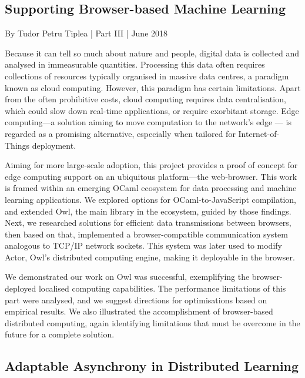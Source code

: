 \hypertarget{Supporting Browser-based Machine Learning}{%
\subsection{Supporting Browser-based Machine Learning}\label{theses-webml}}

By Tudor Petru Tiplea | Part III | June 2018

Because it can tell so much about nature and people, digital data is collected and analysed in immeasurable quantities. Processing this data often requires collections of resources typically organised in massive data centres, a paradigm known as cloud computing. However, this paradigm has certain limitations. Apart from the often prohibitive costs, cloud computing requires data centralisation, which could slow down real-time applications, or require exorbitant storage. Edge computing—a solution aiming to move computation to the network's edge — is regarded as a promising alternative, especially when tailored for Internet-of-Things deployment.

Aiming for more large-scale adoption, this project provides a proof of concept for edge computing support on an ubiquitous platform—the web-browser. This work is framed within an emerging OCaml ecosystem for data processing and machine learning applications. We explored options for OCaml-to-JavaScript compilation, and extended Owl, the main library in the ecosystem, guided by those findings. Next, we researched solutions for efficient data transmissions between browsers, then based on that, implemented a browser-compatible communication system analogous to TCP/IP network sockets. This system was later used to modify Actor, Owl's distributed computing engine, making it deployable in the browser.

We demonstrated our work on Owl was successful, exemplifying the browser-deployed localised computing capabilities. The performance limitations of this part were analysed, and we suggest directions for optimisations based on empirical results. We also illustrated the accomplishment of browser-based distributed computing, again identifying limitations that must be overcome in the future for a complete solution.


\hypertarget{Adaptable Asynchrony in Distributed Learning}{%
\subsection{Adaptable Asynchrony in Distributed Learning}\label{theses-adapt}}

